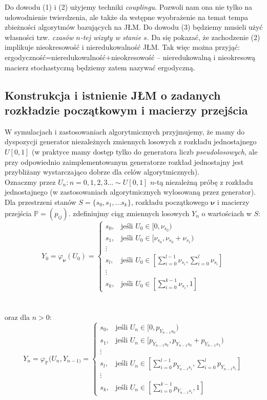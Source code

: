 \documentclass[a4paper]{article}
\theoremstyle{defn}
\theoremstyle{theorem}
\theoremstyle{lemma}
\theoremstyle{cor}
\theoremstyle{fact}
\begin{document}
Do dowodu (1) i (2) użyjemy techniki \textit{couplingu}. Pozwoli nam ona nie tylko na udowodnienie twierdzenia, ale także da wstępne wyobrażenie na temat tempa zbieżności algorytmów bazujących na JŁM. Do dowodu (3) będziemy musieli użyć własności tzw. \textit{czasów $n$-tej wizyty w stanie $s$}. Da się pokazać, że zachodzenie (2) implikuje nieokresowość i nieredukowalność JŁM. Tak więc można przyjąć: ergodyczność=nieredukowalność+nieokresowość – nieredukowalną i nieokresową macierz stochastyczną będziemy zatem nazywać ergodyczną.

\subsection{Konstrukcja i istnienie JŁM o zadanych rozkładzie początkowym i macierzy przejścia}
\label{sect2.3}
W symulacjach i zastosowaniach algorytmicznych przyjmujemy, że mamy do dyspozycji generator niezależnych zmiennych losowych z rozkładu jednostajnego $U[0,1]$ (w praktyce mamy dostęp tylko do generatora liczb \textit{pseudolosowych}, ale przy odpowiednio zaimplementowanym generatorze rozkład jednostajny jest przybliżany wystarczająco dobrze dla celów algorytmicznych). \\
Oznaczmy przez $U_n : n = 0,1,2,3... \sim U[0,1]$ $n$-tą niezależną próbę z rozkładu jednostajnego (w zastosowaniach algorytmicznych wylosowaną przez generator). Dla przestrzeni stanów $S = \{s_0, s_1, ... s_k\}$, rozkładu początkowego $\boldsymbol{\nu}$ i macierzy przejścia $\mathbb{P} = (p_{ij})$. zdefiniujmy ciąg zmiennych losowych $Y_n$  o wartościach w $S$:
    $$Y_0 = \varphi_{\boldsymbol{\nu}}(U_0) =
    \begin{cases}
      s_0, & \text{jeśli } U_0 \in [0, \nu_{s_0}) \\
      s_1, & \text{jeśli } U_0 \in [\nu_{s_0}, \nu_{s_0}+\nu_{s_1}) \\
      \vdots \\
      s_l, & \text{jeśli } U_0 \in [\sum\limits_{i=0}^{l-1} \nu_{s_i}, \sum\limits_{i=0}^{l} \nu_{s_i}] \\
      \vdots \\
      s_k, & \text{jeśli } U_0 \in [\sum\limits_{i=0}^{k-1} \nu_{s_i}, 1]
    \end{cases}$$\\
    \\oraz dla $n > 0$: $$Y_n= \varphi_{\mathbb{P}}(U_n, Y_{n-1)} =
    \begin{cases}
      s_0, & \text{jeśli } U_n \in [0, p_{Y_{n-1} s_0}) \\
      s_1, & \text{jeśli } U_n \in [p_{Y_{n-1} s_0}, p_{Y_{n-1} s_0} + p_{Y_{n-1} s_1}) \\
      \vdots \\
      s_l, & \text{jeśli } U_n \in [\sum\limits_{i=0}^{l-1} p_{Y_{n-1} s_i}, \sum\limits_{i=0}^{l} p_{Y_{n-1} s_i}] \\
      \vdots \\
      s_k, & \text{jeśli } U_n \in [\sum\limits_{i=0}^{k-1} p_{Y_{n-1} s_i}, 1]
    \end{cases}$$
\end{document}

